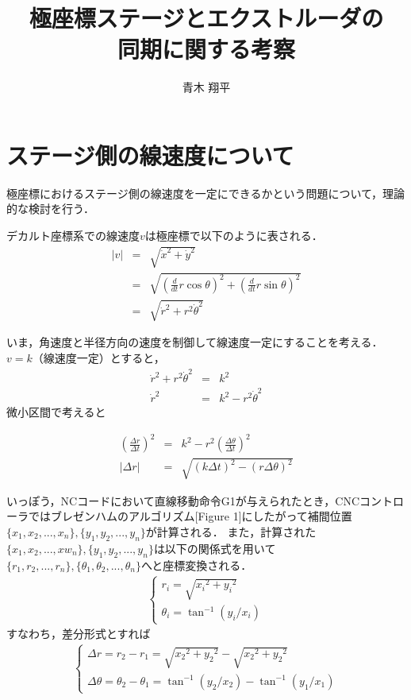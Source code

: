 \documentclass[twocolumn,oneside,a4paper]{article}
\title{極座標ステージとエクストルーダの\\同期に関する考察}
\author{青木 翔平}
\begin{document}
\maketitle

\section{ステージ側の線速度について}
極座標におけるステージ側の線速度を一定にできるかという問題について，理論的な検討を行う．

デカルト座標系での線速度$v$は極座標で以下のように表される．
\begin{eqnarray}
|v| &=& \sqrt{\dot{x}^2 + \dot{y}^2} \nonumber \\
  &=& \sqrt{ \left(\frac{d}{dt} r \cos\theta \right) ^2 + \left(\frac{d}{dt}r \sin\theta\right) ^2} \nonumber \\
  &=& \sqrt{ \dot{r}^2+ r^2 \dot{\theta}^2 } 
\end{eqnarray}	
	
いま，角速度と半径方向の速度を制御して線速度一定にすることを考える．
$v=k$（線速度一定）とすると，
\begin{eqnarray}\label{eq:vdef}
  \dot{r}^2+ r^2 \dot{\theta}^2 &=& k^2 \\
  \dot{r}^2 &=&  k^2 - r^2 \dot{\theta}^2 
\end{eqnarray}
微小区間で考えると

\begin{eqnarray}\label{eq:deltar}
	\left( \frac{\Delta r}{\Delta t}\right)^2 &=&  k^2 - r^2 \left( \frac{\Delta \theta}{\Delta t}\right)^2 \nonumber \\
|\Delta r| &=& \sqrt{(k \Delta t)^2 - (r \Delta \theta)^2}
\end{eqnarray}

いっぽう，NCコードにおいて直線移動命令G1が与えられたとき，CNCコントローラではブレゼンハムのアルゴリズム[Figure 1]にしたがって補間位置$\{x_1,x_2,...,x_n\},\{y_1,y_2,...,y_n\}$が計算される．
また，計算された$\{x_1,x_2,...,xw_n\},\{y_1,y_2,...,y_n\}$は以下の関係式を用いて$\{r_1,r_2,...,r_n\},\{\theta_1,\theta_2,...,\theta_n\}$へと座標変換される．　
\begin{eqnarray*}
\left\{
  \begin{array}{ll}
r_i = \sqrt{{x_i}^2+{y_i}^2} \\	
\theta_i = \tan^{-1} (y_i / x_i)
  \end{array}
  \right.
\end{eqnarray*}
すなわち，差分形式とすれば
\begin{eqnarray}\label{eq:diff}
\left\{
  \begin{array}{ll}
\Delta r = r_2-r_1 = \sqrt{{x_2}^2+{y_2}^2} - \sqrt{{x_2}^2+{y_2}^2} \\	
\Delta \theta = \theta_2-\theta_1 = \tan^{-1} (y_2 / x_2) - \tan^{-1} (y_1 / x_1)
  \end{array}
  \right. 
\end{eqnarray}
\end{document}
